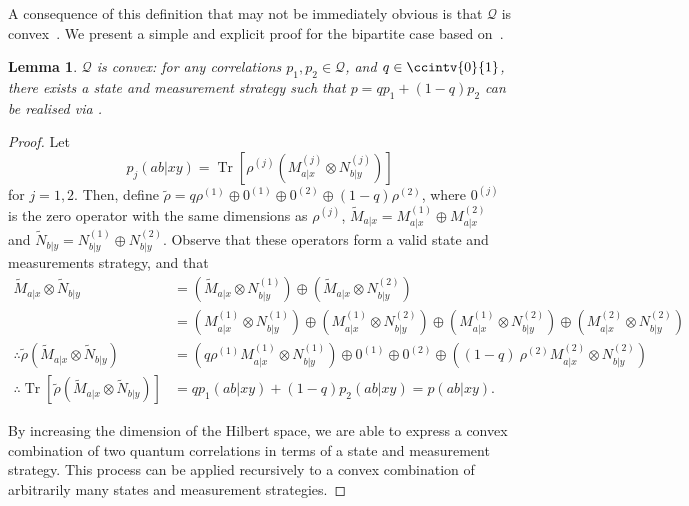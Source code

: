 \documentclass[10pt, a4paper]{article}
\numberwithin{equation}{section} %
\newcounter{stmt} %
\theoremstyle{definition}
\theoremstyle{plain}
\newtheorem{lemma}[stmt]{Lemma}
\newcommand{\?}{\mathrel{?}} %
\newcommand{\Tr}[2][]{\mathop{\mathrm{Tr}#1}\left[ #2 \right]} %
\newcommand{\Qs}{\mathcal{Q}}
\begin{document}
    A consequence of this definition that may not be immediately obvious is that \(\Qs\) is convex~\cites[Sec. V.C]{AllBellIneqs22}[Prop. 5.1.2]{CombNLContext}. We present a simple and explicit proof for the bipartite case based on~\cite[App. E]{FiniteDimNonconvex}.
    \begin{lemma}\label{thm:Qcvx}
      \(\Qs\) is convex: for any correlations \(p_1, p_2 \in \Qs\), and \(q\in\ccintv{0}{1}\), there exists a state and measurement strategy such that \(p = qp_1 + (1-q)p_2\) can be realised via .
    \end{lemma}
    \begin{proof}
      Let
      \[ p_j(ab|xy) = \Tr{\rho^{(j)} \left( M_{a|x}^{(j)} \otimes N_{b|y}^{(j)} \right) } \]
      for \(j = 1,2\). Then, define \(\tilde{\rho} = q\rho^{(1)} \oplus 0^{(1)} \oplus 0^{(2)} \oplus (1-q)\rho^{(2)}\), where \(0^{(j)}\) is the zero operator with the same dimensions as \(\rho^{(j)}\), \(\tilde{M}_{a|x} = M_{a|x}^{(1)} \oplus M_{a|x}^{(2)}\) and \(\tilde{N}_{b|y} = N_{b|y}^{(1)} \oplus N_{b|y}^{(2)}\). Observe that these operators form a valid state and measurements strategy, and that
      \begin{align*}
        \tilde{M}_{a|x} \otimes \tilde{N}_{b|y} &= \left(\tilde{M}_{a|x} \otimes N_{b|y}^{(1)}\right) \oplus \left(\tilde{M}_{a|x} \otimes N_{b|y}^{(2)}\right) \\
                                                &=  \left(M_{a|x}^{(1)} \otimes N_{b|y}^{(1)}\right) \oplus \left(M_{a|x}^{(1)} \otimes N_{b|y}^{(2)}\right) \oplus \left(M_{a|x}^{(1)} \otimes N_{b|y}^{(2)}\right) \oplus \left(M_{a|x}^{(2)} \otimes N_{b|y}^{(2)}\right) \\
        \therefore \tilde{\rho} \left( \tilde{M}_{a|x} \otimes \tilde{N}_{b|y} \right) &= \left(q\rho^{(1)} M_{a|x}^{(1)} \otimes N_{b|y}^{(1)}\right) \oplus 0^{(1)} \oplus 0^{(2)} \oplus \left((1-q)\ \rho^{(2)} M_{a|x}^{(2)} \otimes N_{b|y}^{(2)}\right) \\
        \therefore \Tr{ \tilde{\rho} \left( \tilde{M}_{a|x} \otimes \tilde{N}_{b|y} \right) } &= qp_1(ab|xy) + (1-q)p_2(ab|xy) = p(ab|xy).
      \end{align*}

      By increasing the dimension of the Hilbert space, we are able to express a convex combination of two quantum correlations in terms of a state and measurement strategy. This process can be applied recursively to a convex combination of arbitrarily many states and measurement strategies.
    \end{proof}
\end{document}
